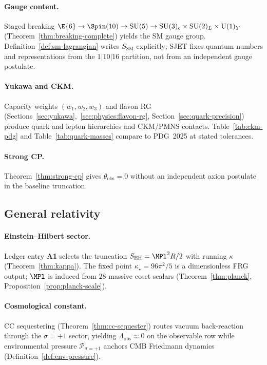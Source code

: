 \paragraph{Gauge content.}
Staged breaking
$\E{6}\to\Spin(10)\to\mathrm{SU}(5)\to\mathrm{SU}(3)_c\times\mathrm{SU}(2)_L\times\mathrm{U}(1)_Y$
(Theorem~\ref{thm:breaking-complete}) yields the SM gauge group.
Definition~\ref{def:sm-lagrangian} writes $S_{\mathrm{SM}}$ explicitly;
SJET fixes quantum numbers and representations from the $1|10|16$ partition,
not from an independent gauge postulate.

\paragraph{Yukawa and CKM.}
Capacity weights $(w_1,w_2,w_3)$ and flavon RG
(Sections~\ref{sec:yukawa},~\ref{sec:physics:flavon-rg},
Section~\ref{sec:quark-precision}) produce quark and lepton hierarchies and
CKM/PMNS contacts. Table~\ref{tab:ckm-pdg} and Table~\ref{tab:quark-masses}
compare to PDG~2025 at stated tolerances.

\paragraph{Strong CP.}
Theorem~\ref{thm:strong-cp} gives $\theta_{\mathrm{obs}}=0$ without an
independent axion postulate in the baseline truncation.

\subsection{General relativity}
\label{sec:standard-theories:gr}

\paragraph{Einstein--Hilbert sector.}
Ledger entry \textbf{A1} selects the truncation $S_{\mathrm{EH}}=\MPl^2 R/2$
with running $\kappa$ (Theorem~\ref{thm:kappa}). The fixed point
$\kappa_\star=96\pi^2/5$ is a dimensionless FRG output; $\MPl$ is induced from
$28$ massive coset scalars (Theorem~\ref{thm:planck}, Proposition~\ref{prop:planck-scale}).

\paragraph{Cosmological constant.}
CC sequestering (Theorem~\ref{thm:cc-sequester}) routes vacuum back-reaction
through the $\sigma=+1$ sector, yielding $\Lambda_{\mathrm{obs}}\approx 0$ on
the observable row while environmental pressure $\mathcal{P}_{\sigma=+1}$
anchors CMB Friedmann dynamics (Definition~\ref{def:env-pressure}).

